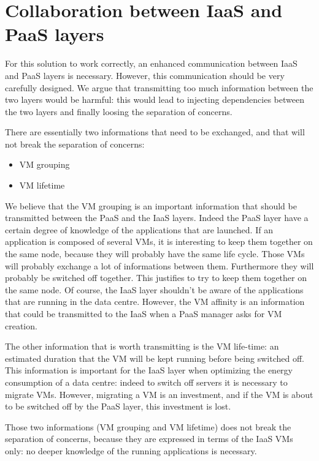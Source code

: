 
\section{Collaboration between IaaS and PaaS layers}
\label{sec:iaaspaas}

For this solution to work correctly, an enhanced communication between IaaS and PaaS layers is necessary.
However, this communication should be very carefully designed.
We argue that transmitting too much information between the two layers would be harmful: this would lead to injecting dependencies between the two layers and finally loosing the separation of concerns.

There are essentially two informations that need to be exchanged, and that will not break the separation of concerns:
\begin{itemize}
  \item VM grouping
  \item VM lifetime
\end{itemize}

We believe that the VM grouping is an important information that should be transmitted between the PaaS and the IaaS layers.
Indeed the PaaS layer have a certain degree of knowledge of the applications that are launched.
If an application is composed of several VMs, it is interesting to keep them together on the same node, because they will probably have the same life cycle.
Those VMs will probably exchange a lot of informations between them. Furthermore they will probably be switched off together.
This justifies to try to keep them together on the same node.
Of course, the IaaS layer shouldn't be aware of the applications that are running in the data centre.
However, the VM affinity is an information that could be transmitted to the IaaS when a PaaS manager asks for VM creation.

The other information that is worth transmitting is the VM life-time: an estimated duration that the VM will be kept running before being switched off.
This information is important for the IaaS layer when optimizing the energy consumption of a data centre: indeed to switch off servers it is necessary to migrate VMs.
However, migrating a VM is an investment, and if the VM is about to be switched off by the PaaS layer, this investment is lost.

Those two informations (VM grouping and VM lifetime) does not break the separation of concerns, because they are expressed in terms of the IaaS VMs only: no deeper knowledge of the running applications is necessary.
